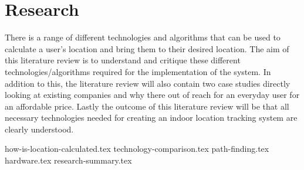 \section{Research}
There is a range of different technologies and algorithms that can be used to calculate a user’s location and bring them to their desired location. The aim of this literature review is to understand and critique these different technologies/algorithms required for the implementation of the system. In addition to this, the literature review will also contain two case studies directly looking at existing companies and why there out of reach for an everyday user for an affordable price. Lastly the outcome of this literature review will be that all necessary technologies needed for creating an indoor location tracking system are clearly understood. 
		
{how-is-location-calculated.tex}
{technology-comparison.tex}
{path-finding.tex}
{hardware.tex}
{research-summary.tex}
		